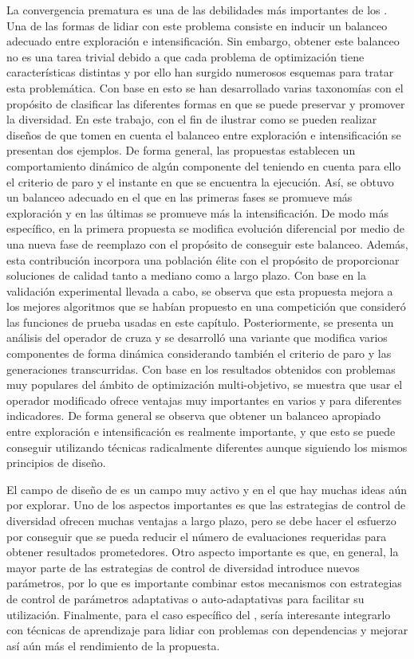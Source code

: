 La convergencia prematura es una de las debilidades más importantes de los \EAS{}.
%
Una de las formas de lidiar con este problema consiste en inducir un balanceo adecuado entre exploración e intensificación.
%
Sin embargo, obtener este balanceo no es una tarea trivial debido a que cada problema de optimización tiene características distintas y por
ello han surgido numerosos esquemas para tratar esta problemática.
%
Con base en esto se han desarrollado varias taxonomías con el propósito de clasificar las diferentes formas en que se puede preservar y promover la diversidad.
%
En este trabajo, con el fin de ilustrar como se pueden realizar diseños de \EAS{} que tomen en cuenta el balanceo entre exploración e intensificación
se presentan dos ejemplos.
%
De forma general, las propuestas establecen un comportamiento dinámico de algún componente del \EA{} teniendo en cuenta para ello el criterio de paro 
y el instante en que se encuentra la ejecución.
%
Así, se obtuvo un balanceo adecuado en el que en las primeras fases se promueve más exploración y en las últimas se promueve más la intensificación. 
%
De modo más específico, en la primera propuesta se modifica evolución diferencial por medio de una nueva fase de reemplazo con el propósito de conseguir este balanceo. 
%
Además, esta contribución incorpora una población élite con el propósito de proporcionar soluciones de calidad tanto a mediano como a largo plazo.
%
Con base en la validación experimental llevada a cabo, se observa que esta propuesta mejora a los mejores algoritmos que se habían propuesto en una competición
que consideró las funciones de prueba usadas en este capítulo.
%
Posteriormente, se presenta un análisis del operador de cruza \SBX{} y se desarrolló una variante que modifica varios componentes de forma dinámica
considerando también el criterio de paro y las generaciones transcurridas. 
%
Con base en los resultados obtenidos con problemas muy populares del ámbito de optimización multi-objetivo, se muestra que usar el operador \SBX{} modificado ofrece ventajas muy importantes
en varios \MOEAS{} y para diferentes indicadores.
%
De forma general se observa que obtener un balanceo apropiado entre exploración e intensificación es realmente importante, y que
esto se puede conseguir utilizando técnicas radicalmente diferentes aunque siguiendo los mismos principios de diseño.

El campo de diseño de \EAS{} es un campo muy activo y en el que hay muchas ideas aún por explorar.
%
Uno de los aspectos importantes es que las estrategias de control de diversidad ofrecen muchas ventajas a largo plazo, 
pero se debe hacer el esfuerzo por conseguir que se pueda reducir el número de evaluaciones requeridas para obtener 
resultados prometedores.
%
Otro aspecto importante es que, en general, la mayor parte de las estrategias de control de diversidad introduce nuevos parámetros, por lo que es importante
combinar estos mecanismos con estrategias de control de parámetros adaptativas o auto-adaptativas para facilitar su utilización.
%
Finalmente, para el caso específico del \DSBX{}, sería interesante integrarlo con técnicas de aprendizaje para lidiar con problemas con dependencias y mejorar
así aún más el rendimiento de la propuesta.
